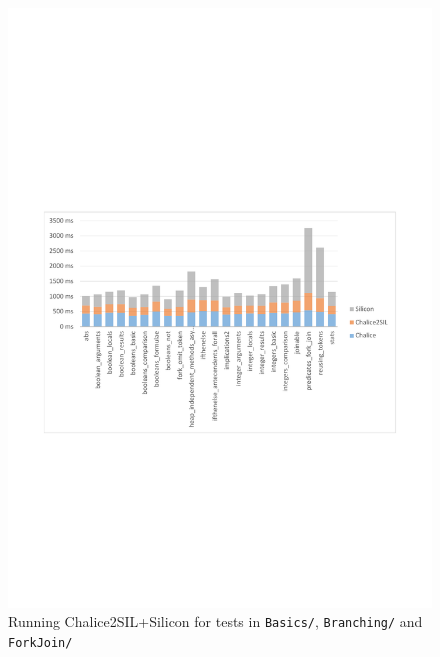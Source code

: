 \begin{figure}
\includegraphics[width=145mm]{src/data/groups-1-3.pdf}
\caption{Running Chalice2SIL+Silicon for tests in \texttt{Basics/}, \texttt{Branching/} and \texttt{ForkJoin/}}\label{fig:perf-grp-1-3}
\end{figure}

